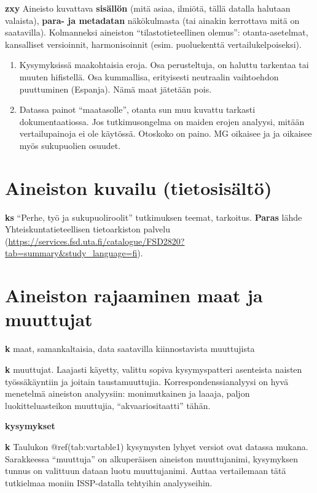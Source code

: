 \documentclass[
  finnish,
]{book}
\begin{document}
\textbf{zxy} Aineisto kuvattava \textbf{sisällön} (mitä asiaa, ilmiötä,
tällä datalla halutaan valaista), \textbf{para- ja metadatan}
näkökulmasta (tai ainakin kerrottava mitä on saatavilla). Kolmanneksi
aineiston ``tilastotieteellinen olemus'': otanta-asetelmat, kansalliset
versioinnit, harmonisoinnit (esim. puoluekenttä vertailukelpoiseksi).

\begin{enumerate}
\def\labelenumi{\arabic{enumi}.}
\item
  Kysymyksissä maakohtaisia eroja. Osa perusteltuja, on haluttu
  tarkentaa tai muuten hifistellä. Osa kummallisa, erityisesti
  neutraalin vaihtoehdon puuttuminen (Espanja). Nämä maat jätetään pois.
\item
  Datassa painot ``maatasolle'', otanta sun muu kuvattu tarkasti
  dokumentaatiossa. Jos tutkimusongelma on maiden erojen analyysi,
  mitään vertailupainoja ei ole käytössä. Otoskoko on paino. MG oikaisee
  ja ja oikaisee myös sukupuolien osuudet.
\end{enumerate}

\hypertarget{aineiston-kuvailu-tietosisuxe4ltuxf6}{%
\section{Aineiston kuvailu
(tietosisältö)}\label{aineiston-kuvailu-tietosisuxe4ltuxf6}}

\textbf{ks} ``Perhe, työ ja sukupuoliroolit'' tutkimuksen teemat,
tarkoitus. \textbf{Paras} lähde Yhteiskuntatieteellisen tietoarkiston
palvelu
(\url{https://services.fsd.uta.fi/catalogue/FSD2820?tab=summary\&study_language=fi}).

\hypertarget{aineiston-rajaaminen-maat-ja-muuttujat}{%
\section{Aineiston rajaaminen maat ja
muuttujat}\label{aineiston-rajaaminen-maat-ja-muuttujat}}

\textbf{k} maat, samankaltaisia, data saatavilla kiinnostavista
muuttujista

\textbf{k} muuttujat. Laajasti käyetty, valittu sopiva kysymyspatteri
asenteista naisten työssäkäyntiin ja joitain taustamuuttujia.
Korrespondenssianalyysi on hyvä menetelmä aineiston analyysiin:
monimutkainen ja laaaja, paljon luokitteluasteikon muuttujia,
``akvaariositaatti'' tähän.

\textbf{kysymykset}

\textbf{k} Taulukon @ref(tab:vartable1) kysymysten lyhyet versiot ovat
datassa mukana. Sarakkeessa ``muuttuja'' on alkuperäisen aineiston
muuttujanimi, kysymyksen tunnus on valittuun dataan luotu muuttujanimi.
Auttaa vertailemaan tätä tutkielmaa moniin ISSP-datalla tehtyihin
analyyseihin.
\end{document}

